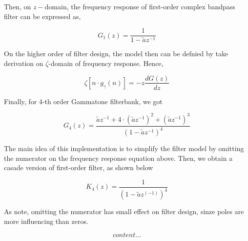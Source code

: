 Then, on \(z-\)domain, the frequency response of first-order complex bandpass filter can be expressed as,

\begin{equation}
	G_1(z) = \frac{1}{1-\tilde{a}z^{-1}}
\end{equation}

On the higher order of filter design, the model then can be defnied by take derivation on $\zeta$-domain of frequency response. Hence,

\begin{equation}
	\zeta[n \cdot g_{\gamma}(n)] = -z \frac{dG(z)}{dz}
\end{equation}

Finally, for 4-th order Gammatone filterbank, we got

\begin{equation}
	G_4(z) = \frac{\tilde{a}z^{-1} + 4 \cdot (\tilde{a}z^{-1})^2 + (\tilde{a}z^{-1})^3}{(1-\tilde{a}z^{-1})^4}
\end{equation}

The main idea of this implementation is to simplify the filter model by omitting the numerator on the frequency response equation above. Then, we obtain a casade version of first-order filter, as shown below 

\begin{equation}
	K_4(z) = \frac{1}{(1-\tilde{a}z^(-1))^4}
\end{equation} 

As note, omitting the numerator has small effect on filter design, sinze poles are more influencing than zeros. 

\begin{equation}
	content...
\end{equation}